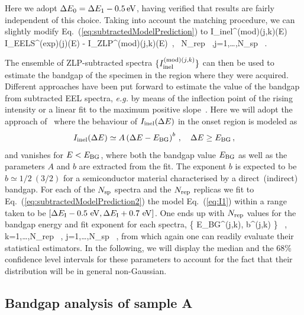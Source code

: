  Here we adopt $\Delta E_0 = \Delta E_1 -0.5\,{\rm eV}$,  having verified
 that results are fairly independent of this choice.
 Taking into account the matching procedure, we can slightly modify Eq.~(\ref{eq:subtractedModelPrediction})
 to 
 \be
 \label{eq:subtractedModelPrediction2}
 I_{\rm inel}^{({\rm mod})(j,k)}(\Delta E) \equiv I_{\rm EELS}^{({\rm exp})(j)}(\Delta E) - I_{\rm ZLP}^{({\rm mod})(j,k)}(\Delta E)\, ,
 \quad \forall~N_{\rm rep} \, ,\quad j=1,\ldots,N_{\rm sp} \, .
 \ee

 The ensemble of ZLP-subtracted spectra $\{I_{\rm inel}^{({\rm mod})(j,k)} \} $
 can then be used to estimate the bandgap of the specimen in the region where
 they were acquired.
 Different approaches  have been put forward to estimate the value of the bandgap from 
subtracted EEL spectra, \textit{e.g.} by means of the inflection point of the rising intensity or
a linear fit to the maximum positive slope~\cite{Schamm:2003}.
%
Here we will adopt the approach of~\cite{Rafferty:2000} where the behaviour
of $I_{\rm inel}(\Delta E)$ in the onset region is modeled as
\begin{equation}
  \label{eq:I1}
    I_{\rm inel}(\Delta E) \simeq  A \left( \Delta E-E_{\rm BG} \right)^{b} \, , \quad \Delta E \ge E_{\rm BG} \, ,
\end{equation}
and vanishes for $E < E_{\rm BG}$, where both the bandgap value
$E_{\rm BG}$ as well as the parameters $A$ and $b$ are extracted from the fit.
%
The exponent $b$ is expected to be $b\simeq 1/2~(3/2)$ for a semiconductor material characterised
by a direct~(indirect) bandgap.
 For each of the $N_{\rm sp}$ spectra and the $N_{\rm rep}$ replicas
 we fit to Eq.~(\ref{eq:subtractedModelPrediction2}) the model Eq.~(\ref{eq:I1})
 within a range taken to be
 $\left[ \Delta E_{\rm I} - 0.5~{\rm eV}, \Delta E_{\rm I} + 0.7~{\rm eV}\right]$.
 One ends up with $N_{\rm rep}$ values for
 the bandgap energy and fit exponent for each spectra,
 \be
 \Big \{ E_{\rm BG}^{(j,k)}, b^{(j,k)} \Big\} \, , \quad k=1,\ldots,N_{\rm rep} \, ,
 \quad j=1,\ldots,N_{\rm sp} \, ,
 \ee
 from which again one can readily evaluate their statistical estimators.
 In the following, we will display the median and the 68\% confidence level intervals
 for these parameters to account for the fact that their distribution will be in general non-Gaussian.

 \subsection{Bandgap analysis of sample A}

